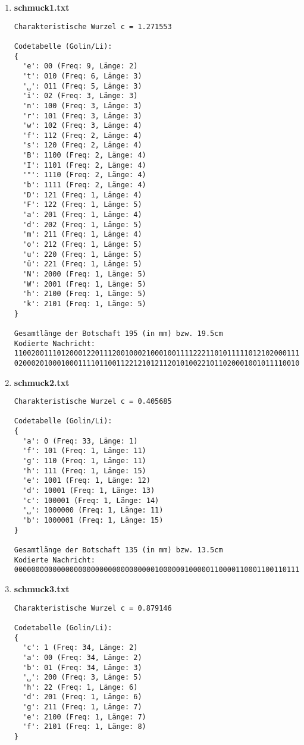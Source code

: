 \documentclass[a4paper,10pt,ngerman]{scrartcl}
\begin{document}
\begin{enumerate}
  \item \textbf{schmuck1.txt}
\begin{verbatim}
Charakteristische Wurzel c = 1.271553

Codetabelle (Golin/Li):
{
  'e': 00 (Freq: 9, Länge: 2)
  't': 010 (Freq: 6, Länge: 3)
  '␣': 011 (Freq: 5, Länge: 3)
  'i': 02 (Freq: 3, Länge: 3)
  'n': 100 (Freq: 3, Länge: 3)
  'r': 101 (Freq: 3, Länge: 3)
  'w': 102 (Freq: 3, Länge: 4)
  'f': 112 (Freq: 2, Länge: 4)
  's': 120 (Freq: 2, Länge: 4)
  'B': 1100 (Freq: 2, Länge: 4)
  'I': 1101 (Freq: 2, Länge: 4)
  '"': 1110 (Freq: 2, Länge: 4)
  'b': 1111 (Freq: 2, Länge: 4)
  'D': 121 (Freq: 1, Länge: 4)
  'F': 122 (Freq: 1, Länge: 5)
  'a': 201 (Freq: 1, Länge: 4)
  'd': 202 (Freq: 1, Länge: 5)
  'm': 211 (Freq: 1, Länge: 4)
  'o': 212 (Freq: 1, Länge: 5)
  'u': 220 (Freq: 1, Länge: 5)
  'ü': 221 (Freq: 1, Länge: 5)
  'N': 2000 (Freq: 1, Länge: 5)
  'W': 2001 (Freq: 1, Länge: 5)
  'h': 2100 (Freq: 1, Länge: 5)
  'k': 2101 (Freq: 1, Länge: 5)
}

Gesamtlänge der Botschaft 195 (in mm) bzw. 19.5cm
Kodierte Nachricht: 1100200111012000122011120010002100010011112221101011111012102000111100220100202001201
02000201000100011110110011221210121120101002210110200010010111100102001011111001110
\end{verbatim}
  \item \textbf{schmuck2.txt}
\begin{verbatim}
Charakteristische Wurzel c = 0.405685

Codetabelle (Golin/Li):
{
  'a': 0 (Freq: 33, Länge: 1)
  'f': 101 (Freq: 1, Länge: 11)
  'g': 110 (Freq: 1, Länge: 11)
  'h': 111 (Freq: 1, Länge: 15)
  'e': 1001 (Freq: 1, Länge: 12)
  'd': 10001 (Freq: 1, Länge: 13)
  'c': 100001 (Freq: 1, Länge: 14)
  '␣': 1000000 (Freq: 1, Länge: 11)
  'b': 1000001 (Freq: 1, Länge: 15)
}

Gesamtlänge der Botschaft 135 (in mm) bzw. 13.5cm
Kodierte Nachricht: 00000000000000000000000000000000010000001000001100001100011001101110111
\end{verbatim}
  \item \textbf{schmuck3.txt}
\begin{verbatim}
Charakteristische Wurzel c = 0.879146

Codetabelle (Golin/Li):
{
  'c': 1 (Freq: 34, Länge: 2)
  'a': 00 (Freq: 34, Länge: 2)
  'b': 01 (Freq: 34, Länge: 3)
  '␣': 200 (Freq: 3, Länge: 5)
  'h': 22 (Freq: 1, Länge: 6)
  'd': 201 (Freq: 1, Länge: 6)
  'g': 211 (Freq: 1, Länge: 7)
  'e': 2100 (Freq: 1, Länge: 7)
  'f': 2101 (Freq: 1, Länge: 8)
}


\end{verbatim}
\end{enumerate}
\end{document}
